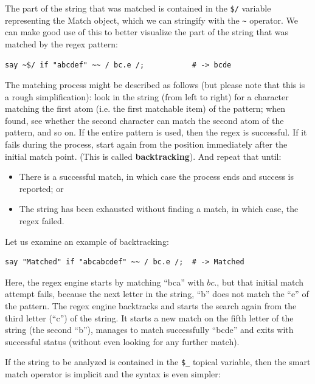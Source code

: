 The part of the string that was matched is contained in the 
\verb'$/' variable representing the Match object, which we 
can stringify with the \verb'~' operator. We can make good 
use of this to better visualize the part of the string 
that was matched by the regex pattern:

\begin{verbatim}
say ~$/ if "abcdef" ~~ / bc.e /;           # -> bcde
\end{verbatim}
%



The matching process might be described as follows (but please 
note that this is a rough simplification): look 
in the string (from left to right) for a character matching 
the first atom (i.e. the first matchable item) of the 
pattern; when found, see whether the second 
character can match the second atom of the pattern, and so on. 
If the entire pattern is used, then the regex is successful.
If it fails during the process, start again from the position 
immediately after the initial match point. (This is called 
{\bf backtracking}). And repeat that until:

\begin{itemize}
\item There is a successful match, in which case the process 
ends and success is reported; or 
\item The string has been exhausted without finding a match, 
in which case, the regex failed.
\end{itemize}

Let us examine an example of backtracking:
\begin{verbatim}
say "Matched" if "abcabcdef" ~~ / bc.e /;  # -> Matched
\end{verbatim}
%
Here, the regex engine starts by matching ``bca'' with 
$bc.$, but that initial match attempt fails, because the 
next letter in the string, ``b'' does not match the ``e'' 
of the pattern. The regex engine backtracks and starts the 
search again from the third letter (``c'') of the string. 
It starts a new match on the fifth letter of the string 
(the second ``b''), manages to match successfully ``bcde'' and 
exits with successful status (without even looking for any 
further match).

If the string to be analyzed is contained in the \verb'$_' 
topical variable, then the smart match operator is implicit 
and the syntax is even simpler:

